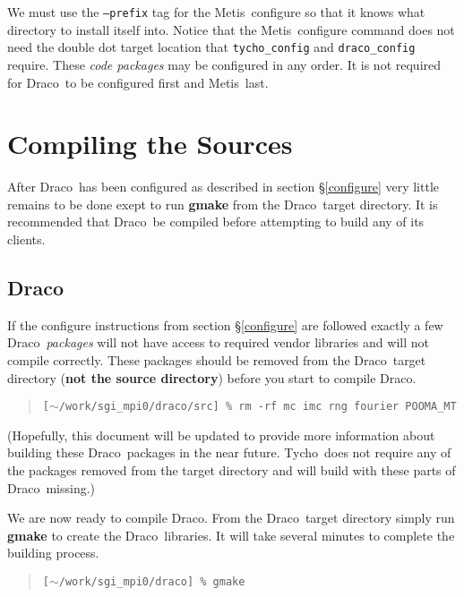 \documentclass[11pt]{nmemo}
\newcommand{\comp}[1]{\normalfont\normalsize\texttt{#1}}
\newcommand{\draco}{{\normalfont\sffamily Draco}}
\newcommand{\tycho}{{\normalfont\sffamily Tycho}}
\newcommand{\metis}{{\normalfont\sffamily Metis}}
\begin{document}
We must use the \comp{--prefix} tag for the \metis\ configure so that
it knows what directory to install itself into.  Notice that the
\metis\ configure command does not need the double dot target location
that \comp{tycho\_config} and \comp{draco\_config} require.  These
\emph{code packages} may be configured in any order.  It is not
required for \draco\ to be configured first and \metis\ last.


\section{Compiling the Sources}
\label{compile}

After \draco\ has been configured as described in section
\S\ref{configure} very little remains to be done exept to run
\textbf{gmake} from the \draco\ target directory.  It is recommended
that \draco\ be compiled before attempting to build any of its
clients. 

\subsection{\draco}

If the configure instructions from section \S\ref{configure} are
followed exactly a few \draco\ \emph{packages} will not have access to
required vendor libraries and will not compile correctly.  These
packages should be removed from the \draco\ target directory
(\textbf{not the source directory}) before you start to compile
\draco.

\begin{verse}
\texttt{[$\sim$/work/sgi\_mpi0/draco/src] \% rm -rf mc imc rng fourier POOMA\_MT}
\end{verse}

(Hopefully, this document will be updated to provide more information
about building these \draco\ packages in the near future.  \tycho\ 
does not require any of the packages removed from the target directory
and will build with these parts of \draco\ missing.)

We are now ready to compile \draco.  From the \draco\ target directory 
simply run \textbf{gmake} to create the \draco\ libraries.  It will
take several minutes to complete the building process.

\begin{verse}
\texttt{[$\sim$/work/sgi\_mpi0/draco] \% gmake}
\end{verse}
\end{document}
